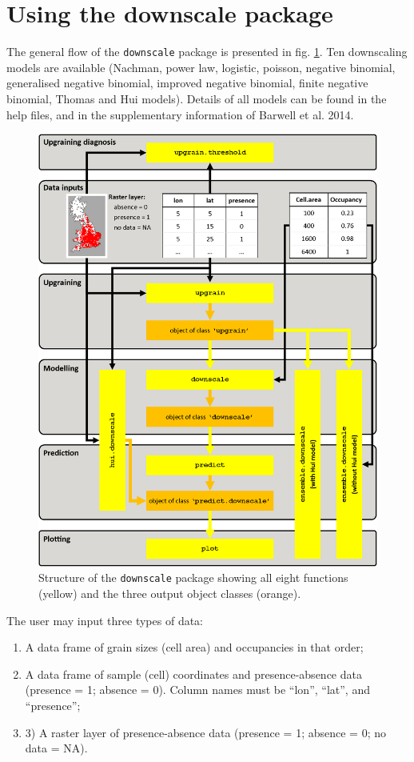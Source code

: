 \documentclass{article}[12pt, a4paper]
\begin{document}
\section{Using the downscale package}

The general flow of the \texttt{downscale} package is presented in fig. \ref{fig:Flow}. Ten downscaling models are available (Nachman, power law, logistic, poisson, negative binomial, generalised negative binomial, improved negative binomial, finite negative binomial, Thomas and Hui models). Details of all models can be found in the help files, and in the supplementary information of Barwell et al. 2014. 

\begin{figure}[!t]
\centering
\includegraphics[width=\linewidth]{Flow.png}
\caption{Structure of the \texttt{downscale} package showing all eight functions (yellow) and the three output object classes (orange).}
\label{fig:Flow}
\end{figure}

The user may input three types of data:
\begin{enumerate} \itemsep1pt \parskip0pt 
\item [1)] A data frame of grain sizes (cell area) and occupancies in that order;
\item [2)] A data frame of sample (cell) coordinates and presence-absence data (presence = 1; absence = 0). Column names must be “lon”, “lat”, and “presence”;
\item [3)] 3)  A raster layer of presence-absence data (presence = 1; absence = 0; no data = NA).
\end{enumerate}
\end{document}
